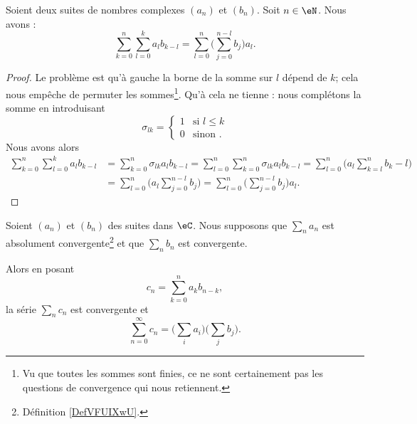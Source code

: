 \begin{lemma}       \label{LEMooNYAXooKUuQFe}
    Soient deux suites de nombres complexes \( (a_n)\) et \( (b_n)\). Soit \( n\in \eN\). Nous avons :
    \begin{equation}
        \sum_{k=0}^n\sum_{l=0}^ka_lb_{k-l}=\sum_{l=0}^n\big( \sum_{j=0}^{n-l}b_j \big)a_l.
    \end{equation}
\end{lemma}

\begin{proof}
    Le problème est qu'à gauche la borne de la somme sur \( l\) dépend de \( k\); cela nous empêche de permuter les sommes\footnote{Vu que toutes les sommes sont finies, ce ne sont certainement pas les questions de convergence qui nous retiennent.}. Qu'à cela ne tienne : nous complétons la somme en introduisant
    \begin{equation}
         \sigma_{lk}=\begin{cases}
            1    &   \text{si } l\leq k\\
            0    &    \text{sinon }.
        \end{cases}
    \end{equation}
    Nous avons alors
    \begin{subequations}
        \begin{align}
            \sum_{k=0}^n\sum_{l=0}^ka_lb_{k-l}&=\sum_{k=0}^n\sigma_{lk}a_lb_{k-l}=\sum_{l=0}^n\sum_{k=0}^n\sigma_{lk}a_lb_{k-l} =\sum_{l=0}^n\big( a_l\sum_{k=l}^nb_k-l \big)\\
            &=\sum_{l=0}^n\big( a_l\sum_{j=0}^{n-l}b_j \big)=\sum_{l=0}^n\big( \sum_{j=0}^{n-l}b_j \big)a_l.
        \end{align}
    \end{subequations}
\end{proof}

\begin{proposition}
    Soient \( (a_n)\) et \( (b_n)\) des suites dans \( \eC\). Nous supposons que \( \sum_na_n\) est absolument convergente\footnote{Définition \ref{DefVFUIXwU}.} et que \( \sum_nb_n\) est convergente.

    Alors en posant
    \begin{equation}
        c_n=\sum_{k=0}^na_kb_{n-k},
    \end{equation}
    la série \( \sum_nc_n\) est convergente et
    \begin{equation}
        \sum_{n=0}^{\infty}c_n=\big( \sum_ia_i \big)\big( \sum_j b_j \big).
    \end{equation}
\end{proposition}

